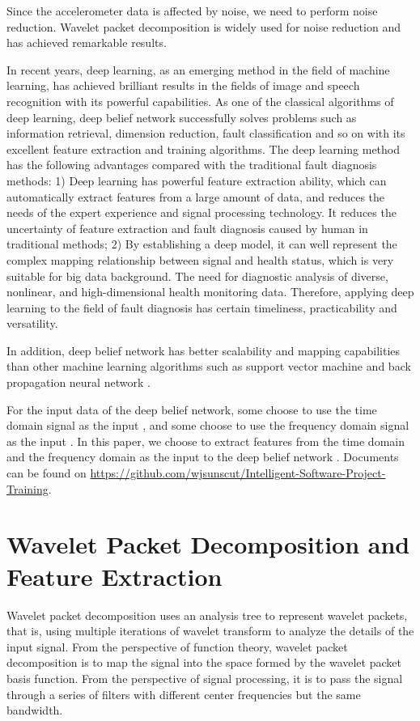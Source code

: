 \documentclass{bioinfo}
\begin{document}
Since the accelerometer data is affected by noise, we need to perform noise reduction. Wavelet packet decomposition \cite{Wang2015Detection}\cite{Yongle2015Zero} is widely used for noise reduction and has achieved remarkable results.


In recent years, deep learning, as an emerging method in the field of machine learning, has achieved brilliant results in the fields of image and speech recognition with its powerful capabilities. As one of the classical algorithms of deep learning, deep belief network \cite{Hinton2012A} successfully solves problems such as information retrieval, dimension reduction, fault classification and so on with its excellent feature extraction and training algorithms. The deep learning method has the following advantages compared with the traditional fault diagnosis methods: 1) Deep learning has powerful feature extraction ability, which can automatically extract features from a large amount of data, and reduces the needs of the expert experience and signal processing technology. It reduces the uncertainty of feature extraction and fault diagnosis caused by human in traditional methods; 2) By establishing a deep model, it can well represent the complex mapping relationship between signal and health status, which is very suitable for big data background. The need for diagnostic analysis of diverse, nonlinear, and high-dimensional health monitoring data. Therefore, applying deep learning to the field of fault diagnosis has certain timeliness, practicability and versatility.

In addition, deep belief network has better scalability and mapping capabilities than other machine learning algorithms such as support vector machine \cite{vapnik1999overview} and back propagation neural network \cite{Kramer1990Diagnosis}.

For the input data of the deep belief network, some choose to use the time domain signal as the input \cite{guangquan2016fault}, and some choose to use the frequency domain signal as the input \cite{jia2016deep}. In this paper, we choose to extract features from the time domain and the frequency domain as the input to the deep belief network \cite{YiThe}. Documents can be found on \href{https://github.com/wjsunscut/Intelligent-Software-Project-Training}{https://github.com/wjsunscut/Intelligent-Software-Project-Training}.

\section{Wavelet Packet Decomposition and Feature Extraction}
Wavelet packet decomposition uses an analysis tree to represent wavelet packets, that is, using multiple iterations of wavelet transform to analyze the details of the input signal. From the perspective of function theory, wavelet packet decomposition is to map the signal into the space formed by the wavelet packet basis function. From the perspective of signal processing, it is to pass the signal through a series of filters with different center frequencies but the same bandwidth.
\end{document}
